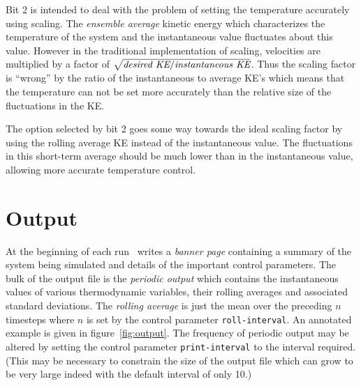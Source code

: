 Bit 2 is intended to deal with the problem of setting the temperature
accurately using scaling.  The {\em ensemble average\/} kinetic energy
which characterizes the temperature of the system and the
instantaneous value fluctuates about this value.  However in the
traditional implementation of scaling, velocities are multiplied by a
factor of $\sqrt{\mbox{\it desired KE} / \mbox{\it instantaneous
KE}}$.  Thus the scaling factor is ``wrong'' by the ratio of the
instantaneous to average KE's which means that the temperature can not
be set more accurately than the relative size of the fluctuations in
the KE.  

The option selected by bit 2 goes some way towards the ideal scaling
factor by using the rolling average KE instead of the instantaneous
value.  The fluctuations in this short-term average should be much
lower than in the instantaneous value, allowing more accurate
temperature control. 

\section{Output}%
\label{sec:output}
At the beginning of each run \moldy\  writes a {\em banner page\/}
containing a summary of the system being simulated and details of the
important control parameters. The bulk of the output file is the {\em
periodic output\/} which contains the instantaneous values of various
thermodynamic variables, their rolling averages and associated
standard deviations. The {\em rolling average\/} is just the mean over
the preceding $n$ timesteps where $n$ is set by the control parameter
\verb'roll-interval'.   An annotated example is given in
figure~\ref{fig:output}.  The frequency of periodic output may be
altered by setting the control parameter \verb'print-interval' to the
interval required.  (This may be necessary to constrain the size of
the output file which can grow to be very large indeed with the
default interval of only 10.)

